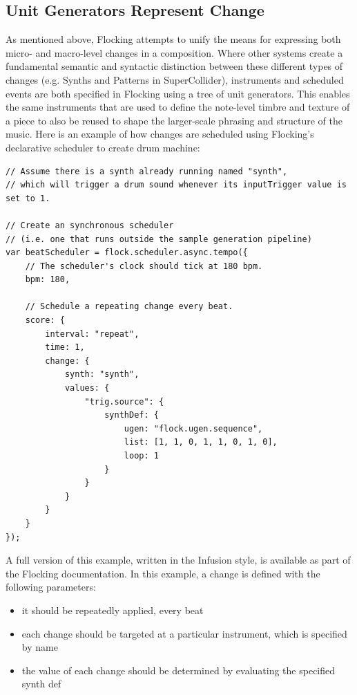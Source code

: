 \documentclass{article}
\begin{document}
\subsection{Unit Generators Represent Change}

As mentioned above, Flocking attempts to unify the means for expressing both micro- and macro-level changes in a composition. Where other systems create a fundamental semantic and syntactic distinction between these different types of changes (e.g. Synths and Patterns in SuperCollider), instruments and scheduled events are both specified in Flocking using a tree of unit generators. This enables the same instruments that are used to define the note-level timbre and texture of a piece to also be reused to shape the larger-scale phrasing and structure of the music. Here is an example of how changes are scheduled using Flocking's declarative scheduler to create drum machine:

\begin{verbatim}
// Assume there is a synth already running named "synth",
// which will trigger a drum sound whenever its inputTrigger value is set to 1.

// Create an synchronous scheduler
// (i.e. one that runs outside the sample generation pipeline)
var beatScheduler = flock.scheduler.async.tempo({
    // The scheduler's clock should tick at 180 bpm.
    bpm: 180,

    // Schedule a repeating change every beat.
    score: {
        interval: "repeat",
        time: 1,
        change: {
            synth: "synth",
            values: {
                "trig.source": {
                    synthDef: {
                        ugen: "flock.ugen.sequence",
                        list: [1, 1, 0, 1, 1, 0, 1, 0],
                        loop: 1
                    }
                }
            }
        }
    }
});

\end{verbatim}

A full version of this example, written in the Infusion style, is available as part of the Flocking documentation. In this example, a change is defined with the following parameters:

\begin{itemize}
\item it should be repeatedly applied, every beat
\item each change should be targeted at a particular instrument, which is specified by name
\item the value of each change should be determined by evaluating the specified synth def
\end{itemize}
\end{document}
